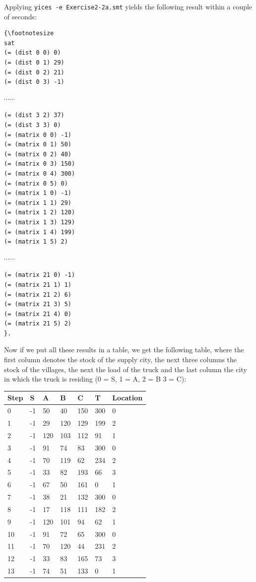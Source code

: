 \documentclass[12pt]{article}
\begin{document}
{\noindent Applying {\tt yices -e Exercise2-2a.smt} yields the following result within a couple of seconds:
\begin{verbatim}
{\footnotesize
sat
(= (dist 0 0) 0)
(= (dist 0 1) 29)
(= (dist 0 2) 21)
(= (dist 0 3) -1)
\end{verbatim}
$\cdots \cdots$ 
\begin{verbatim}
(= (dist 3 2) 37)
(= (dist 3 3) 0)
(= (matrix 0 0) -1)
(= (matrix 0 1) 50)
(= (matrix 0 2) 40)
(= (matrix 0 3) 150)
(= (matrix 0 4) 300)
(= (matrix 0 5) 0)
(= (matrix 1 0) -1)
(= (matrix 1 1) 29)
(= (matrix 1 2) 120)
(= (matrix 1 3) 129)
(= (matrix 1 4) 199)
(= (matrix 1 5) 2)
\end{verbatim}
$\cdots \cdots$ 
\begin{verbatim}
(= (matrix 21 0) -1)
(= (matrix 21 1) 1)
(= (matrix 21 2) 6)
(= (matrix 21 3) 5)
(= (matrix 21 4) 0)
(= (matrix 21 5) 2)
}.
\end{verbatim}
\noindent Now if we put all these results in a table, we get the following table, where the first column denotes the stock of the supply city, the next three columns the stock of the villages, the next the load of the truck and the last column the city in which the truck is residing (0 = S, 1 = A, 2 = B 3 = C):\\
\begin{center}
\begin{tabular}{| l | l | l | l | l | l | l |}
\hline
Step 	& S	& A	& B	& C 	& T 	& Location\\
\hline
0	& 	-1	&	50	&	40 	&	150	&	300	&	0	\\
1	& 	-1	&	29	&	120 	&	129	&	199	&	2	\\
2	& 	-1	&	120	&	103 	&	112	&	91	&	1	\\
3	& 	-1	&	91	&	74 	&	83	&	300	&	0	\\
4	& 	-1	&	70	&	119 	&	62	&	234	&	2	\\
5	& 	-1	&	33	&	82 	&	193	&	66	&	3	\\
6	& 	-1	&	67	&	50 	&	161	&	0	&	1	\\
7	& 	-1	&	38	&	21 	&	132	&	300	&	0	\\
8	& 	-1	&	17	&	118 	&	111	&	182	&	2	\\
9	& 	-1	&	120	&	101 	&	94	&	62	&	1	\\
10	& 	-1	&	91	&	72 	&	65	&	300	&	0	\\
11	& 	-1	&	70	&	120 	&	44	&	231	&	2	\\
12	& 	-1	&	33	&	83 	&	165	&	73	&	3	\\
13	& 	-1	&	74	&	51 	&	133	&	0	&	1	\\

\end{tabular}
\end{center}}
\end{document}
